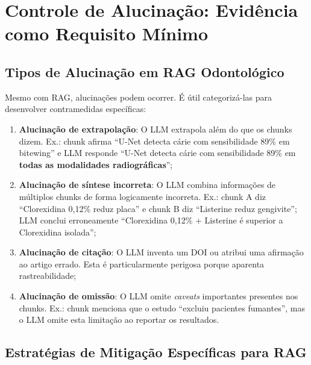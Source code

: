 \section{Controle de Alucinação: Evidência como Requisito Mínimo}

\subsection{Tipos de Alucinação em RAG Odontológico}

Mesmo com RAG, alucinações podem ocorrer. É útil categorizá-las para desenvolver contramedidas específicas:

\begin{enumerate}
    \item \textbf{Alucinação de extrapolação}: O LLM extrapola além do que os chunks dizem. Ex.: chunk afirma ``U-Net detecta cárie com sensibilidade 89\% em bitewing'' e LLM responde ``U-Net detecta cárie com sensibilidade 89\% em \textbf{todas as modalidades radiográficas}'';

    \item \textbf{Alucinação de síntese incorreta}: O LLM combina informações de múltiplos chunks de forma logicamente incorreta. Ex.: chunk A diz ``Clorexidina 0,12\% reduz placa'' e chunk B diz ``Listerine reduz gengivite''; LLM conclui erroneamente ``Clorexidina 0,12\% + Listerine é superior a Clorexidina isolada'';

    \item \textbf{Alucinação de citação}: O LLM inventa um DOI ou atribui uma afirmação ao artigo errado. Esta é particularmente perigosa porque aparenta rastreabilidade;

    \item \textbf{Alucinação de omissão}: O LLM omite \textit{caveats} importantes presentes nos chunks. Ex.: chunk menciona que o estudo ``excluiu pacientes fumantes'', mas o LLM omite esta limitação ao reportar os resultados.
\end{enumerate}

\subsection{Estratégias de Mitigação Específicas para RAG}

